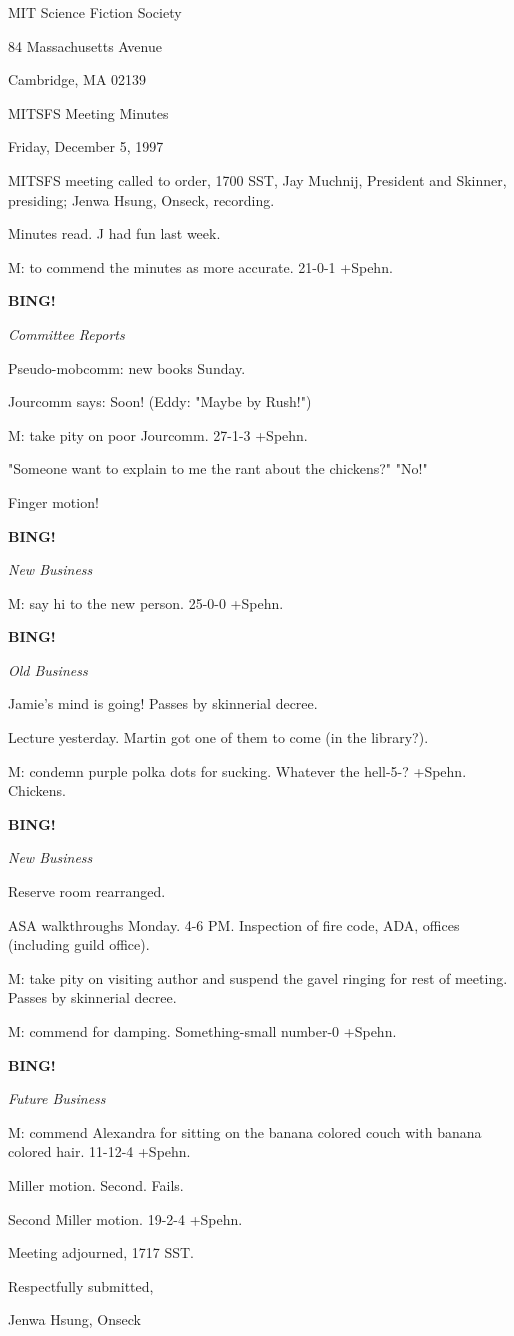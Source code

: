 \documentclass[12pt]{article}
\newcommand{\bing}{{\bf BING!} }
\newcommand{\goto}[1]{\bing \vskip 12pt \centerline{{\em{#1}}}}
\begin{document}
\begin{center}

MIT Science Fiction Society 

84 Massachusetts Avenue

Cambridge, MA 02139

\vspace{12pt}

MITSFS Meeting Minutes 

Friday, December 5, 1997

\end{center}
 
\vspace{18pt}

\setlength{\parskip}{6pt}

\noindent
MITSFS meeting called to order, 1700 SST,
Jay Muchnij, President and Skinner, presiding; Jenwa Hsung, Onseck, recording.

Minutes read. J had fun last week.

M: to commend the minutes as more accurate. 21-0-1 +Spehn.

\goto{Committee Reports}

Pseudo-mobcomm: new books Sunday.

Jourcomm says: Soon! (Eddy: "Maybe by Rush!")

M: take pity on poor Jourcomm. 27-1-3 +Spehn.

"Someone want to explain to me the rant about the chickens?" "No!"

Finger motion!

\goto{New Business}

M: say hi to the new person. 25-0-0 +Spehn.

\goto{Old Business}

Jamie's mind is going! Passes by skinnerial decree.

Lecture yesterday. Martin got one of them to come (in the library?).

M: condemn purple polka dots for sucking. Whatever the hell-5-? +Spehn. Chickens.

\goto{New Business}

Reserve room rearranged.

ASA walkthroughs Monday. 4-6 PM. Inspection of fire code, ADA, offices (including guild office).

M: take pity on visiting author and suspend the gavel ringing for rest of meeting. Passes by skinnerial decree.

M: commend for damping. Something-small number-0 +Spehn.

\goto{Future Business}

M: commend Alexandra for sitting on the banana colored couch with banana colored hair. 11-12-4 +Spehn.

Miller motion. Second. Fails.

Second Miller motion. 19-2-4 +Spehn.

\vspace{12pt}

\noindent
Meeting adjourned, 1717 SST.

\vspace{18pt}

\centerline{Respectfully submitted,}
\centerline{Jenwa Hsung, Onseck}
\end{document}
